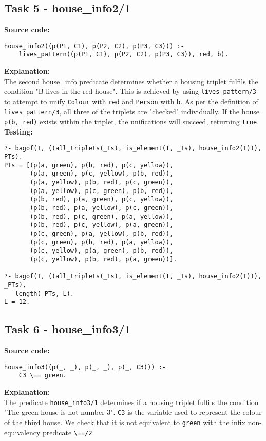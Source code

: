\documentclass[11pt]{article}
\begin{document}
\subsection{Task 5 - house\_info2/1}
\textbf{Source code:}
\begin{verbatim}
house_info2((p(P1, C1), p(P2, C2), p(P3, C3))) :-
    lives_pattern((p(P1, C1), p(P2, C2), p(P3, C3)), red, b). 
\end{verbatim}

\textbf{Explanation:} \\
The second house\_info predicate determines whether a housing triplet fulfils the condition "B lives in the red house". This is achieved by using {\verb|lives_pattern/3|} to attempt to unify {\verb|Colour|} with {\verb|red|} and {\verb|Person|} with {\verb|b|}. As per the definition of {\verb|lives_pattern/3|}, all three of the triplets are "checked" individually. If the house {\verb|p(b, red)|} exists within the triplet, the unifications will succeed, returning {\verb|true|}.\\

\textbf{Testing:}
\begin{verbatim}
?- bagof(T, ((all_triplets(_Ts), is_element(T, _Ts), house_info2(T))), PTs).
PTs = [(p(a, green), p(b, red), p(c, yellow)),
       (p(a, green), p(c, yellow), p(b, red)),  
       (p(a, yellow), p(b, red), p(c, green)),  
       (p(a, yellow), p(c, green), p(b, red)),  
       (p(b, red), p(a, green), p(c, yellow)),  
       (p(b, red), p(a, yellow), p(c, green)),  
       (p(b, red), p(c, green), p(a, yellow)),  
       (p(b, red), p(c, yellow), p(a, green)),  
       (p(c, green), p(a, yellow), p(b, red)),  
       (p(c, green), p(b, red), p(a, yellow)),  
       (p(c, yellow), p(a, green), p(b, red)),  
       (p(c, yellow), p(b, red), p(a, green))].

?- bagof(T, ((all_triplets(_Ts), is_element(T, _Ts), house_info2(T))), _PTs),      
   length(_PTs, L).
L = 12.
\end{verbatim}
\newpage

\subsection{Task 6 - house\_info3/1}
\textbf{Source code:}
\begin{verbatim}
house_info3((p(_, _), p(_, _), p(_, C3))) :-
    C3 \== green.
\end{verbatim}

\textbf{Explanation:} \\
The predicate {\verb|house_info3/1|} determines if a housing triplet fulfils the condition "The green house is not number 3". {\verb|C3|} is the variable used to represent the colour of the third house. We check that it is not equivalent to {\verb|green|} with the infix non-equivalency predicate {\verb|\==/2|}. \\
\end{document}
